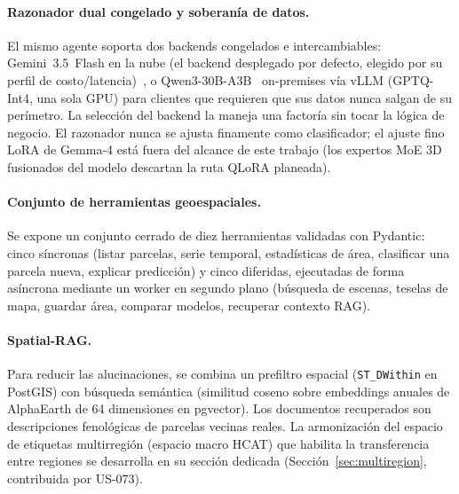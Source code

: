 \paragraph{Razonador dual congelado y soberanía de datos.}
El mismo agente soporta dos backends congelados e intercambiables:
Gemini~3.5~Flash en la nube (el backend desplegado por defecto, elegido
por su perfil de costo/latencia)~\cite{google2025gemini25}, o
Qwen3-30B-A3B~\cite{yang2025qwen3} on-premises vía vLLM
(GPTQ-Int4, una sola GPU) para clientes que requieren que sus datos
nunca salgan de su perímetro. La selección del backend la maneja una
factoría sin tocar la lógica de negocio. El razonador nunca se ajusta
finamente como clasificador; el ajuste fino LoRA de Gemma-4 está fuera
del alcance de este trabajo (los expertos MoE 3D fusionados del modelo
descartan la ruta QLoRA planeada).

\paragraph{Conjunto de herramientas geoespaciales.}
Se expone un conjunto cerrado de diez herramientas validadas con
Pydantic: cinco síncronas (listar parcelas, serie temporal, estadísticas
de área, clasificar una parcela nueva, explicar predicción) y cinco
diferidas, ejecutadas de forma asíncrona mediante un worker en segundo
plano (búsqueda de escenas, teselas de mapa, guardar área, comparar
modelos, recuperar contexto RAG).

\paragraph{Spatial-RAG.}
Para reducir las alucinaciones, se combina un prefiltro espacial
(\texttt{ST\_DWithin} en PostGIS) con búsqueda semántica (similitud
coseno sobre embeddings anuales de AlphaEarth de 64 dimensiones en
pgvector). Los documentos recuperados son descripciones fenológicas de
parcelas vecinas reales. La armonización del espacio de etiquetas
multirregión (espacio macro HCAT) que habilita la transferencia entre
regiones se desarrolla en su sección dedicada
(Sección~\ref{sec:multiregion}, contribuida por US-073).
